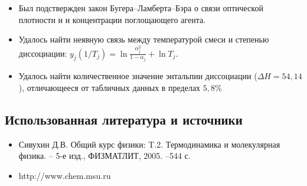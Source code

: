 \documentclass[a4paper,12pt]{article} %
\begin{document}
\begin{itemize}
	\item Был подствержден закон Бугера--Ламберта--Бэра о связи оптической плотности и и концентрации поглощающего агента.
	\item Удалось найти неявную связь между температурой смеси и степенью диссоциации: $y_j(1/T_j) =  \ln \frac{ \alpha_j^2}{1 - \alpha_j} + \ln T_j $.
	\item Удалось найти количественное значение энтальпии диссоциации (\(\Delta H = 54,14 \)), отличающееся от табличных данных в пределах $5,8\%$ \


\end{itemize}


\subsection*{Использованная литература и источники}
\begin{itemize}
	\item Сивухин Д.В. Общий курс физики: T.2. Термодинамика и молекулярная физика. -- 5-е изд., ФИЗМАТЛИТ, 2005. --544 с. 
	\item http://www.chem.msu.ru


\end{itemize}




  
\end{document}
